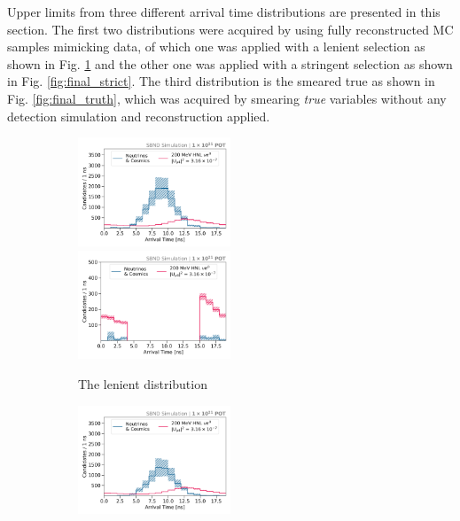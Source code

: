 Upper limits from three different arrival time distributions are presented in this section.
The first two distributions were acquired by using fully reconstructed MC samples mimicking data, of which one was applied with a lenient selection as shown in Fig. \ref{fig:final_relaxed} and the other one was applied with a stringent selection as shown in Fig. \ref{fig:final_strict}.
The third distribution is the smeared true as shown in Fig. \ref{fig:final_truth}, which was acquired by smearing \textit{true} variables without any detection simulation and reconstruction applied.
\begin{figure}[htbp!]
        \begin{subfigure}[b]{1.0\textwidth}
            \includegraphics[width=0.5\textwidth]{relaxed_cut}
            \includegraphics[width=0.5\textwidth]{relaxed_cut_edge}
            \caption{The lenient distribution}%
	    \label{fig:final_relaxed}
     	    \vspace{0.5cm}
        \end{subfigure}
        \begin{subfigure}[b]{1.0\textwidth}
            \includegraphics[width=0.5\textwidth]{strict_cut}

\end{subfigure}
\end{figure}
